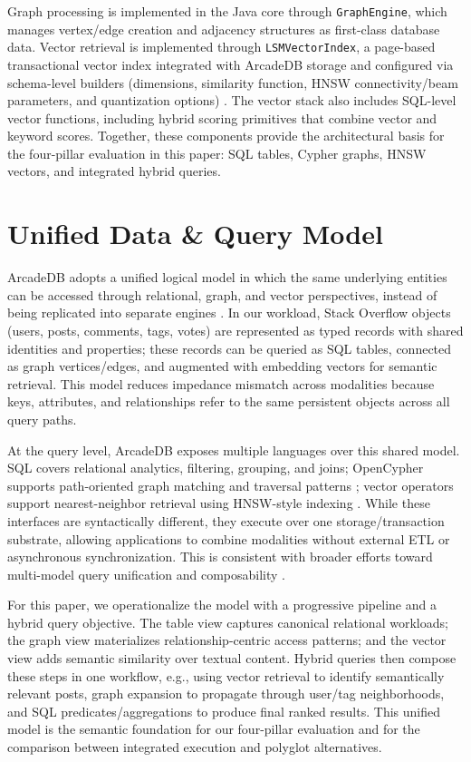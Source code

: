 \documentclass[sigconf, nonacm]{acmart}
\begin{document}
Graph processing is implemented in the Java core through \texttt{GraphEngine}, which manages vertex/edge creation and adjacency structures as first-class database data. Vector retrieval is implemented through \texttt{LSMVectorIndex}, a page-based transactional vector index integrated with ArcadeDB storage and configured via schema-level builders (dimensions, similarity function, HNSW connectivity/beam parameters, and quantization options) \cite{malkov2016efficient}. The vector stack also includes SQL-level vector functions, including hybrid scoring primitives that combine vector and keyword scores. Together, these components provide the architectural basis for the four-pillar evaluation in this paper: SQL tables, Cypher graphs, HNSW vectors, and integrated hybrid queries.

\section{Unified Data \& Query Model}

ArcadeDB adopts a unified logical model in which the same underlying entities can be accessed through relational, graph, and vector perspectives, instead of being replicated into separate engines \cite{Lu_2019,Guo_2023}. In our workload, Stack Overflow objects (users, posts, comments, tags, votes) are represented as typed records with shared identities and properties; these records can be queried as SQL tables, connected as graph vertices/edges, and augmented with embedding vectors for semantic retrieval. This model reduces impedance mismatch across modalities because keys, attributes, and relationships refer to the same persistent objects across all query paths.

At the query level, ArcadeDB exposes multiple languages over this shared model. SQL covers relational analytics, filtering, grouping, and joins; OpenCypher supports path-oriented graph matching and traversal patterns \cite{opencypher_spec,marton2017formalising}; vector operators support nearest-neighbor retrieval using HNSW-style indexing \cite{malkov2016efficient}. While these interfaces are syntactically different, they execute over one storage/transaction substrate, allowing applications to combine modalities without external ETL or asynchronous synchronization. This is consistent with broader efforts toward multi-model query unification and composability \cite{ong2014sqlpp,ISO9075_16_2023}.

For this paper, we operationalize the model with a progressive pipeline and a hybrid query objective. The table view captures canonical relational workloads; the graph view materializes relationship-centric access patterns; and the vector view adds semantic similarity over textual content. Hybrid queries then compose these steps in one workflow, e.g., using vector retrieval to identify semantically relevant posts, graph expansion to propagate through user/tag neighborhoods, and SQL predicates/aggregations to produce final ranked results. This unified model is the semantic foundation for our four-pillar evaluation and for the comparison between integrated execution and polyglot alternatives.
\end{document}
